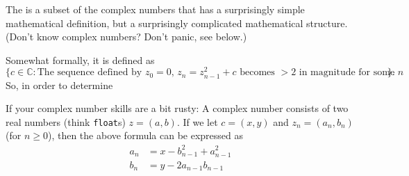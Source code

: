 \documentclass[11pt]{article}
\begin{document}
The  is a subset of the complex numbers that has a surprisingly simple
mathematical definition, but a surprisingly complicated mathematical
structure. (Don't know complex numbers?  Don't panic, see below.)

Somewhat formally, it is defined as
\[
  \{c \in \mathbb C: \text{The sequence defined by $z_0=0$,
  $z_n=z_{n-1}^2 +c$ becomes $> 2$ in magnitude for some $n$}\}.
\]
So, in order to determine

If your complex number skills are a bit rusty: A complex number
consists of two real numbers (think \texttt{float}s) $z=(a,b)$.
If we let $c=(x,y)$ and $z_n=(a_n,b_n)$ (for $n\ge 0$), then the
above formula can be expressed as
\begin{align*}
  a_n &= x-b_{n-1}^2+a_{n-1}^2\\
  b_n &= y-2a_{n-1}b_{n-1}
\end{align*}
\end{document}
